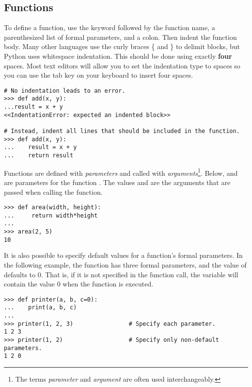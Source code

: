 \subsection*{Functions}

To define a function, use the  keyword followed by the function name, a parenthesized list of formal parameters, and a colon.
Then indent the function body.
Many other languages use the curly braces \{ and \} to delimit blocks, but Python uses whitespace indentation.
This should be done using exactly \textbf{four} spaces.
Most text editors will allow you to set the indentation type to spaces so you can use the tab key on your keyboard to insert four spaces.

\begin{lstlisting}
# No indentation leads to an error.
>>> def add(x, y):
...result = x + y
<<IndentationError: expected an indented block>>

# Instead, indent all lines that should be included in the function.
>>> def add(x, y):
...    result = x + y
...    return result
\end{lstlisting}

Functions are defined with \emph{parameters} and called with \emph{arguments}\footnote{The terms \emph{parameter} and \emph{argument} are often used interchangeably.
}.
Below,  and  are parameters for the function .
The values  and  are the arguments that are passed when calling the function.

\begin{lstlisting}
>>> def area(width, height):
...     return width*height
...         
>>> area(2, 5)
10
\end{lstlisting}

It is also possible to specify default values for a function's formal parameters.
In the following example, the function  has three formal parameters, and the value of  defaults to 0.
That is, if it is not specified in the function call, the variable  will contain the value 0 when the function is executed.

\begin{lstlisting}
>>> def printer(a, b, c=0):
...    print(a, b, c)
...
>>> printer(1, 2, 3)                # Specify each parameter.
1 2 3
>>> printer(1, 2)                   # Specify only non-default parameters.
1 2 0
\end{lstlisting} %

